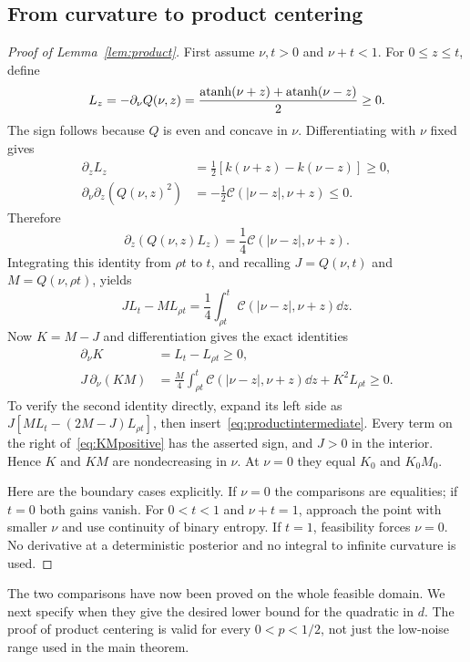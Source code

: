 \subsection{From curvature to product centering}
\begin{proof}[Proof of Lemma~\ref{lem:product}]
First assume $\nu,t>0$ and $\nu+t<1$. For $0\le z\le t$, define
\[
L_z=-\partial_\nu Q(\nu,z)=\frac{\operatorname{atanh}(\nu+z)+\operatorname{atanh}(\nu-z)}2\ge0.
\]
The sign follows because $Q$ is even and concave in $\nu$. Differentiating with $\nu$ fixed gives
\begin{align}\label{eq:mixed}
\partial_zL_z&=\tfrac12[k(\nu+z)-k(\nu-z)]\ge0,\\
\partial_\nu\partial_z(Q(\nu,z)^2)
&=-\tfrac12\mathcal C(|\nu-z|,\nu+z)\le0.\label{eq:Qresidual}
\end{align}
Therefore
\[
\partial_z(Q(\nu,z)L_z)=\frac14\mathcal C(|\nu-z|,\nu+z).
\]
Integrating this identity from $\rho t$ to $t$, and recalling $J=Q(\nu,t)$ and $M=Q(\nu,\rho t)$, yields
\begin{equation}\label{eq:productintermediate}
JL_t-ML_{\rho t}=\frac14\int_{\rho t}^{t}\mathcal C(|\nu-z|,\nu+z)\dd z.
\end{equation}
Now $K=M-J$ and differentiation gives the exact identities
\begin{align}
\partial_\nu K&=L_t-L_{\rho t}\ge0,\label{eq:Kmonotone}\\
J\,\partial_\nu(KM)
&=\frac M4\int_{\rho t}^{t}\mathcal C(|\nu-z|,\nu+z)\dd z
+K^2L_{\rho t}\ge0.\label{eq:KMpositive}
\end{align}
To verify the second identity directly, expand its left side as
$J[ML_t-(2M-J)L_{\rho t}]$, then insert~\eqref{eq:productintermediate}. Every term on the right of~\eqref{eq:KMpositive} has the asserted sign, and $J>0$ in the interior. Hence $K$ and $KM$ are nondecreasing in $\nu$. At $\nu=0$ they equal $K_0$ and $K_0M_0$.

Here are the boundary cases explicitly. If $\nu=0$ the comparisons are equalities; if $t=0$ both gains vanish. For $0<t<1$ and $\nu+t=1$, approach the point with smaller $\nu$ and use continuity of binary entropy. If $t=1$, feasibility forces $\nu=0$. No derivative at a deterministic posterior and no integral to infinite curvature is used.
\end{proof}

The two comparisons have now been proved on the whole feasible domain. We next specify when they give the desired lower bound for the quadratic in $d$. The proof of product centering is valid for every $0<p<1/2$, not just the low-noise range used in the main theorem.

